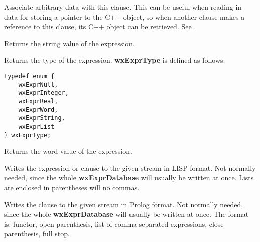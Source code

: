\label{wxexprsetclientdata}


Associate arbitrary data with this clause. This can be useful when
reading in data for storing a pointer to the C++ object, so when another
clause makes a reference to this clause, its C++ object can be retrieved.
See .

\label{wxexprstringvalue}


Returns the string value of the expression.

\label{wxexprtype}


Returns the type of the expression. {\bf wxExprType} is defined as follows:

\begin{verbatim}
typedef enum {
    wxExprNull,
    wxExprInteger,
    wxExprReal,
    wxExprWord,
    wxExprString,
    wxExprList
} wxExprType;
\end{verbatim}

\label{wxexprwordvalue}


Returns the word value of the expression.

\label{wxexprwritelistexpr}


Writes the expression or clause to the given stream in LISP format.
Not normally needed, since the whole {\bf wxExprDatabase} will usually
be written at once. Lists are enclosed in parentheses will no commas.

\label{wxexprwriteprologclause}


Writes the clause to the given stream in Prolog format. Not normally needed, since
the whole {\bf wxExprDatabase} will usually be written at once. The format is:
functor, open parenthesis, list of comma-separated expressions, close parenthesis,
full stop.

\label{wxexprwriteexpr}

